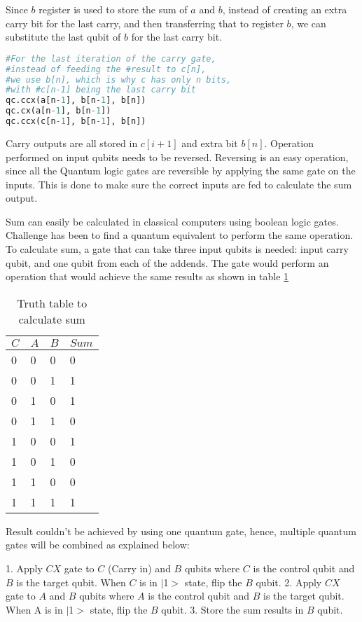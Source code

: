 \documentclass{cpp}
\begin{document}
Since $b$ register is used to store the sum of $a$ and $b$, instead of creating an extra carry bit for the last carry, and then transferring that to register $b$, we can substitute the last qubit of $b$ for the last carry bit.

\newpage
\begin{lstlisting}[language=Python]
#For the last iteration of the carry gate, 
#instead of feeding the #result to c[n], 
#we use b[n], which is why c has only n bits, 
#with #c[n-1] being the last carry bit
qc.ccx(a[n-1], b[n-1], b[n])
qc.cx(a[n-1], b[n-1])
qc.ccx(c[n-1], b[n-1], b[n])
\end{lstlisting}

Carry outputs are all stored in $c[i+1]$ and extra bit $b[n]$. Operation performed on input qubits needs to be reversed. Reversing is an easy operation, since all the Quantum logic gates are reversible by applying the same gate on the inputs. This is done to make sure the correct inputs are fed to calculate the sum output.

Sum can easily be calculated in classical computers using boolean logic gates. Challenge has been to find a quantum equivalent to perform the same operation. To calculate sum, a gate that can take three input qubits is needed: input carry qubit, and one qubit from each of the addends. The gate would perform an operation that would achieve the same results as shown in table \ref{table:table4}

\newpage
\begin{table}[h]
\centering
\caption{Truth table to calculate sum}
\begin{tabular}{llll}
\hline
$C$ &
$A$ &
$B$ &
$Sum$ \\
\hline
0 &
0 &
0 &
0 \\
0 &
0 &
1 &
1 \\
0 &
1 &
0 &
1 \\
0 &
1 &
1 &
0 \\
1 &
0 &
0 &
1 \\
1 &
0 &
1 &
0 \\
1 &
1 &
0 &
0 \\
1 &
1 &
1 &
1 \\
\hline
\end{tabular}
\label{table:table4}
\end{table}

Result couldn't be achieved by using one quantum gate, hence, multiple quantum gates will be combined as explained below:

1.	Apply $CX$ gate to $C$ (Carry in) and $B$ qubits where $C$ is the control qubit and $B$ is the target qubit. When $C$ is in $|$1$>$ state, flip the $B$ qubit. 
2.	Apply $CX$ gate to $A$ and $B$ qubits where $A$ is the control qubit and $B$ is the target qubit. When A is in $|$1$>$ state, flip the $B$ qubit. 
3.	Store the sum results in $B$ qubit. 
\end{document}
